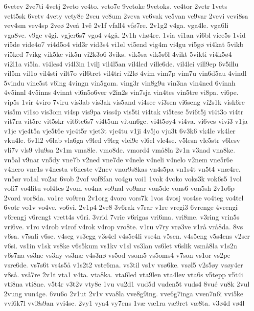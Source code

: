 6vetev
2ve7ti
4vetj
2veto
ve4to.
veto7e
9vetoke
9vetoks.
ve4tor
2vetr
1vets
vett5sk
6vetv
4vety
vety8e
2veu
ve8um
2veva
ve6vak
ve5van
ve9var
2vevi
vevi8sa
vev4sm
vev4sp
2ve^^f8
2ve^^e5
1v^^ea
2v1f
vfall4
vf^^f87re.
2v1g2
v4ga.
vga4le.
vga6li
vga8ve.
v9ge
v4gi.
vgjer6s7
vgo4
v4g^^e5.
2v1h
vh^^f84re.
1via
vi1an
vi6bl
vice5s
1vid
vi5de
vide4o7
vi4d5o4
vid3r
vid3s4
vi1el
vi5end
vig4m
vi4gu
vi5g^^f8
vi4kat
5vikb
vi5ked
7vikg
vik5ke
vik5n
vi2k3o6
3viks.
vik5sa
vik5s6l
4vikt
5vikti
vi4k5^^f84
vi2l1a
vi5la.
vi4les4
vi4l3in
1vilj
vil4l5an
vil4led
ville6de.
vil4lei
vill9ep
6v5illu
vil5m
vil1o
vil4sti
vilt7o
vil6tret
vil4tri
vi2l^^f8
4vim
vim7p
vim7u
vin6d5au
4vindl
5vindu
vine5st
v6ing
4vingn
vin5gom.
ving3r
vin8g9u
vin3na
vin4ned
6vinnh
4v5innl
4v5inns
4vinnt
vi6n5o6ver
v2in2s
vin7sja
vin4tes
vin5tre
vi8pa.
vi6pe.
vip5s
1vir
4viro
7viru
vis3ab
vis3ak
vis5and
vi4see
vi3sen
vi6seng
vi2s1k
visk6re
vis5m
vi1so
vis3om
vi4sp
vis9pa
viss4p
vis5ti
vi4tak
vi5tese
5vi6t5j
vi4t3o
vi4tr
vit7ra
vit5re
vit5skr
vit6te6s7
vi4t5un
vitun6ge.
vi4t5^^f8y4
vi4va.
vi6ves
vivi3
v1ja
v1je
vje4t5a
vje5t6e
vje4t5r
vjet3t
vje4tu
v1ji
4v5jo
vju3t
6v3k6
vk4le
vk4ler
vku4le.
6v1l2
v6lab
vla6ga
v9led
v9leg
vlei9e
vl6el
vle4se.
v5lesn
vle5str
v6lesv
vli7v
vls9
vlu9sa
2v1m
vma8le.
vmo8de.
vmord4
vm^^e58la
2v1n
v3nad
vna8ke.
vn5al
v9nar
vn5dy
vne7b
v2ned
vne7de
v4nele
v4neli
v4nelo
v2nem
vne5r6e
v4nero
vne1s
v4nesta
v6neste
v2nev
vnor9s8kas
vn4s5pa
vn1s4t
vn5t4
vn^^e64re.
vn5^^f8r
vo1al
vo2ar
6vob
2vof
vof8fan
vo4gu
voi1
1vok
4voko
voks3k
vok6s5
1vol
voli7
vo4litu
vol4tes
2vom
vo4na
vo9nal
vo9nar
von5de
vons6
von5sh
2v1o6p
2vord
vor8da.
vo1re
vo9ren
2v1org
4voro
vors7k
1vos
4vosj
vos4se
vo4teg
vo4tel
6votr
vo1v
vo4ve.
vo6vi.
2v1p4
2vr8
3v6rak
v7rar
v1re
vregi3
6vrenge
4vrengi
v6rengj
v6rengt
vrett4s
v6ri.
3vrid
7vrie
v6rigas
vri6ma.
vri8me.
v3ring
vrin5s
vri6ve.
v1ro
v4rob
v4rof
v4rok
v4rop
vro8te.
v1ru
v7ry
vr^^f83ve
v1r^^e5
vr^^e58da.
8vs
v6sa.
v7sali
v6se.
v4seg
vs3egg
v3s4el
v4s5e4li
vse4n
v5sen.
v4s5eng
v5s4ens
v2ser
v6si.
vs1in
v1sk
vs8ke
v6s5kum
vs1kv
v1sl
vs3lan
vs6let
v6slik
vsm^^e58la
v1s2n
v6s7na
vs3ne
vs3ny
vs3n^^e6
v4s3n^^f8
vs5od
vsom5
vs5oms4
v7son
vs1or
vs2pe
vsre6de.
vs7s6t
vs4s5^^e5
v1s2t2
vste6ma.
vs3til
vs1v
vs^^f86ke.
vs^^f8l5
v2s5^^f8y
vs^^f8y4er
v8s^^e5.
vs^^e57re
2v1t
vta1
v4ta.
vta8ka.
vta6led
vta9len
vta4lev
vta6s
v5tepp
v5t4i
vti8na
vti8ne.
v5t4r
v3t2v
vty8e
1vu
vu2d1
vud5d
vuden5t
vuds4
8vu^^e9
vu8k
2vul
2vung
vun4ge.
6vu6o
2v1ut
2v1v
vva8la
vve8g9ing.
vve6g7inga
vven7n6i
vvi5ke
vvi6k7l
vvi8s9an
vvi4se.
2vy1
vya4
vy7ens
1v^^e6
v^^e61ra
v^^e69ret
v^^e68ta.
v3^^f84d
v^^f84l
